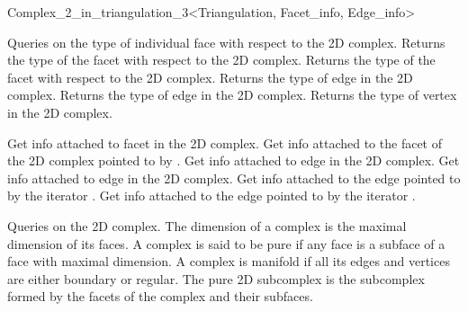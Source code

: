 \begin{ccRefClass}{Complex_2_in_triangulation_3<Triangulation, Facet_info, Edge_info>}

Queries on the type of individual face with respect to the 2D complex.
{Returns the type of the facet   with respect to  the 2D complex.}
\ccGlue
{}
{Returns the type of the facet  with respect to  the 2D complex.}
\ccGlue
{}
{Returns the type of edge  in the 2D complex.}
\ccGlue
{}
{Returns the type of edge   in the 2D complex.}
\ccGlue
{}
{Returns the type of vertex  in the 2D complex.}

\ccGlue
{}

\ccGlue
{}
{Get info attached
to facet  in the 2D complex.
}
\ccGlue
{}
{Get info attached to the facet of the 2D complex pointed
to by .}
\ccGlue
{}
{Get info attached
to edge  in the 2D complex.
}
\ccGlue
{}
{Get info attached
to edge  in the 2D complex.
}
\ccGlue
{}
{Get info attached
to the edge pointed to by the iterator .}
\ccGlue
{}
{Get info attached
to the edge pointed to by the iterator .}




Queries on the 2D complex. 
The dimension of a complex is the maximal dimension of its faces.
A complex is said to be pure if any face is a subface
of a face with maximal dimension. 
A complex is manifold if all its edges and vertices 
are either boundary or regular.
The  pure 2D subcomplex
is the subcomplex formed by the facets of the complex and their subfaces.


\end{ccRefClass}
